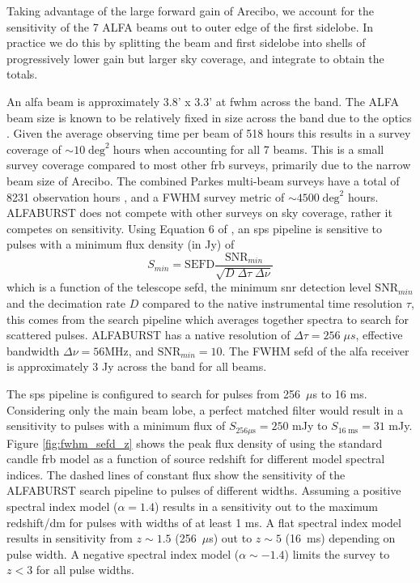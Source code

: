 \documentclass[a4paper,fleqn,usenatbib]{mnras}
\begin{document}
Taking advantage of the large forward gain of Arecibo, we account for
the sensitivity of the 7 ALFA beams out to outer edge of the first
sidelobe. In practice we do this by splitting the beam and first
sidelobe into shells of progressively lower gain but larger sky
coverage, and integrate to obtain the totals.


An \gls{alfa} beam is approximately 3.8' x 3.3' at \gls{fwhm} across
the band.  The ALFA beam size is known to be relatively fixed in size
across the band due to the optics \citep{GALFAbeam}.  Given the
average observing time per beam of 518 hours this results in a survey
coverage of $\sim 10 \; \textrm{deg}^2 \; \textrm{hours}$ when
accounting for all 7 beams. This is a small survey coverage compared
to most other \gls{frb} surveys, primarily due to the narrow beam size
of Arecibo. The combined Parkes multi-beam surveys have a total of
8231 observation hours \citep{2016MNRAS.460.3370C}, and a FWHM survey
metric of $\sim 4500 \; \textrm{deg}^2$ hours.  ALFABURST does not
compete with other surveys on sky coverage, rather it competes on
sensitivity.  Using Equation 6 of \cite{2015MNRAS.452.1254K}, an
\gls{sps} pipeline is sensitive to pulses with a minimum flux density
(in Jy) of
%
\begin{equation}
S_{min} = \textrm{SEFD} \frac{\textrm{SNR}_{min}}{\sqrt{D \; \Delta \tau \;
\Delta \nu}}
\end{equation}
%
which is a function of the telescope \gls{sefd}, the minimum \gls{snr}
detection level $\textrm{SNR}_{min}$ and the decimation rate $D$
compared to the native instrumental time resolution $\tau$, this comes
from the search pipeline which averages together spectra to search for
scattered pulses. ALFABURST has a native resolution of $\Delta \tau =
256 \; \mu s$, effective bandwidth $\Delta \nu = 56 \textrm{MHz}$, and
$\textrm{SNR}_{min} = 10$. The FWHM \gls{sefd} of the \gls{alfa}
receiver is approximately 3 Jy across the band for all beams.

The \gls{sps} pipeline is configured to search for pulses from
256~$\mu$s to 16 ms. Considering only the main beam lobe, a perfect
matched filter would result in a sensitivity to pulses with a minimum
flux of $S_{256 \mu\textrm{s}} = 250$ mJy to $S_{16 \; \textrm{ms}} =
31$ mJy. Figure \ref{fig:fwhm_sefd_z} shows the peak flux density of
using the standard candle \gls{frb} model as a function of source
redshift for different model spectral indices. The dashed lines of
constant flux show the sensitivity of the ALFABURST search pipeline to
pulses of different widths. Assuming a positive spectral index model
($\alpha=1.4$) results in a sensitivity out to the maximum
redshift/\gls{dm} for pulses with widths of at least 1 ms. A flat
spectral index model results in sensitivity from $z \sim 1.5$
(256~$\mu$s) out to $z \sim 5$ (16~ms) depending on pulse width. A
negative spectral index model ($\alpha \sim -1.4$) limits the survey
to $z < 3$ for all pulse widths.
\end{document}
